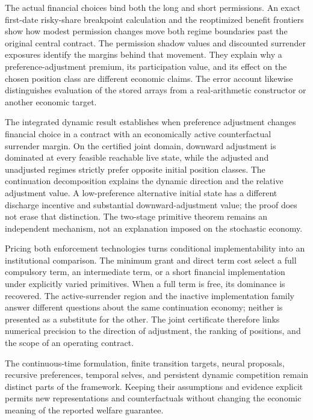 The actual financial choices bind both the long and short permissions. An exact first-date risky-share breakpoint calculation and the reoptimized benefit frontiers show how modest permission changes move both regime boundaries past the original central contract. The permission shadow values and discounted surrender exposures identify the margins behind that movement. They explain why a preference-adjustment premium, its participation value, and its effect on the chosen position class are different economic claims. The error account likewise distinguishes evaluation of the stored arrays from a real-arithmetic constructor or another economic target.


The integrated dynamic result establishes when preference adjustment changes financial choice in a contract with an economically active counterfactual surrender margin. On the certified joint domain, downward adjustment is dominated at every feasible reachable live state, while the adjusted and unadjusted regimes strictly prefer opposite initial position classes. The continuation decomposition explains the dynamic direction and the relative adjustment value. A low-preference alternative initial state has a different discharge incentive and substantial downward-adjustment value; the proof does not erase that distinction. The two-stage primitive theorem remains an independent mechanism, not an explanation imposed on the stochastic economy.

Pricing both enforcement technologies turns conditional implementability into an institutional comparison. The minimum grant and direct term cost select a full compulsory term, an intermediate term, or a short financial implementation under explicitly varied primitives. When a full term is free, its dominance is recovered. The active-surrender region and the inactive implementation family answer different questions about the same continuation economy; neither is presented as a substitute for the other. The joint certificate therefore links numerical precision to the direction of adjustment, the ranking of positions, and the scope of an operating contract.

The continuous-time formulation, finite transition targets, neural proposals, recursive preferences, temporal selves, and persistent dynamic competition remain distinct parts of the framework. Keeping their assumptions and evidence explicit permits new representations and counterfactuals without changing the economic meaning of the reported welfare guarantee.

